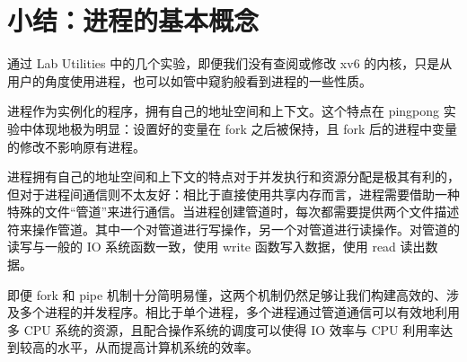 \section{小结：进程的基本概念}

通过 Lab Utilities 中的几个实验，即便我们没有查阅或修改 xv6 的内核，只是从用户的角度使用进程，也可以如管中窥豹般看到进程的一些性质。

进程作为实例化的程序，拥有自己的地址空间和上下文。这个特点在 pingpong 实验中体现地极为明显：设置好的变量在 fork 之后被保持，且 fork 后的进程中变量的修改不影响原有进程。

进程拥有自己的地址空间和上下文的特点对于并发执行和资源分配是极其有利的，但对于进程间通信则不太友好：相比于直接使用共享内存而言，进程需要借助一种特殊的文件“管道”来进行通信。当进程创建管道时，每次都需要提供两个文件描述符来操作管道。其中一个对管道进行写操作，另一个对管道进行读操作。对管道的读写与一般的 IO 系统函数一致，使用 write 函数写入数据，使用 read 读出数据。

即便 fork 和 pipe 机制十分简明易懂，这两个机制仍然足够让我们构建高效的、涉及多个进程的并发程序。相比于单个进程，多个进程通过管道通信可以有效地利用多 CPU 系统的资源，且配合操作系统的调度可以使得 IO 效率与 CPU 利用率达到较高的水平，从而提高计算机系统的效率。